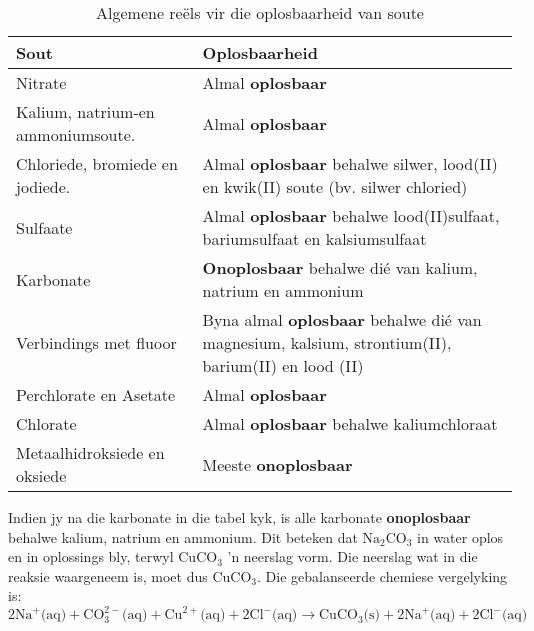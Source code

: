           \begin{table}[H]
        \begin{center}
      \label{m38719*uid69}
    \noindent
      \begin{tabular}{|l|p{8cm}|}\hline
                \textbf{Sout}
               &
                \textbf{Oplosbaarheid} \\ \hline
        Nitrate &
        Almal \textbf{oplosbaar} \\ \hline
        Kalium, natrium-en ammoniumsoute. &
        Almal \textbf{oplosbaar} \\ \hline
        Chloriede, bromiede en jodiede. &
        Almal \textbf{oplosbaar} behalwe silwer, lood(II) en kwik(II) soute (bv. silwer chloried)  \\ \hline
        Sulfaate &
        Almal \textbf{oplosbaar} behalwe lood(II)sulfaat, bariumsulfaat en kalsiumsulfaat \\ \hline
        Karbonate &
        \textbf{Onoplosbaar} behalwe dié van kalium, natrium en ammonium \\ \hline
        Verbindings met fluoor &
        Byna almal \textbf{oplosbaar} behalwe dié van magnesium, kalsium, strontium(II), barium(II) en lood (II) \\ \hline
        Perchlorate en Asetate &
        Almal \textbf{oplosbaar} \\ \hline
        Chlorate &
        Almal \textbf{oplosbaar} behalwe kaliumchloraat \\ \hline
        Metaalhidroksiede en oksiede &
        Meeste \textbf{onoplosbaar} \\ \hline
    \end{tabular}
      \end{center}
    \caption{Algemene re\"{e}ls vir die oplosbaarheid van soute}
\label{tab:solubility}
\end{table}
Indien jy na die karbonate in die tabel kyk, is alle karbonate \textbf{onoplosbaar} behalwe kalium, natrium en ammonium. Dit beteken dat $\text{Na}_{2}\text{CO}_3$ in water oplos en in oplossings bly, terwyl $\text{CuCO}_3$  'n neerslag vorm. Die neerslag wat in die reaksie waargeneem is, moet dus $\text{CuCO}_3$. Die gebalanseerde chemiese vergelyking is:\\
$2\text{Na}^{+} \text{(aq)} + \text{CO}_{3}^{2-} \text{(aq)} + \text{Cu}^{2+} \text{(aq)} + 2\text{Cl}^{-} \text{(aq)} \to \text{CuCO}_{3} \text{(s)} +  2\text{Na}^{+} \text{(aq)} + 2\text{Cl}^{-} \text{(aq)}$ \\
